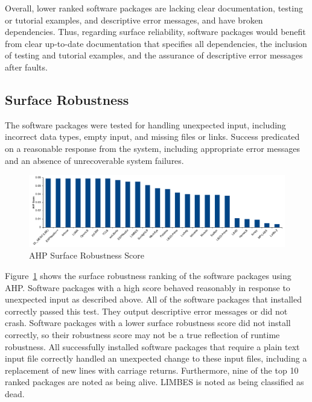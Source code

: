 \documentclass[final, 3p, times, authoryear]{elsarticle}
\begin{document}
Overall, lower ranked software packages are lacking clear documentation, testing
or tutorial examples, and descriptive error messages, and have broken
dependencies. Thus, regarding surface reliability, software packages would
benefit from clear up-to-date documentation that specifies all dependencies, the
inclusion of testing and tutorial examples, and the assurance of descriptive
error messages after faults.

\subsection{Surface Robustness}

The software packages were tested for handling unexpected input, including
incorrect data types, empty input, and missing files or links. Success
predicated on a reasonable response from the system, including appropriate error
messages and an absence of unrecoverable system failures. 

\begin{figure}[h!]
	\begin{center}
		\includegraphics[width=1.0\textwidth]{./figures/robustness_chart.pdf}
		\caption{AHP Surface Robustness Score}
		\label{Fig_Robustness}
	\end{center}
\end{figure}

Figure~\ref{Fig_Robustness} shows the surface robustness ranking of the software
packages using AHP. Software packages with a high score behaved reasonably in
response to unexpected input as described above. All of the software packages
that installed correctly passed this test. They output descriptive error
messages or did not crash. Software packages with a lower surface robustness
score did not install correctly, so their robustness score may not be a true
reflection of runtime robustness. All successfully installed software packages
that require a plain text input file correctly handled an unexpected change to
these input files, including a replacement of new lines with carriage returns.
Furthermore, nine of the top 10 ranked packages are noted as being alive. LIMBES
is noted as being classified as dead.
\end{document}
